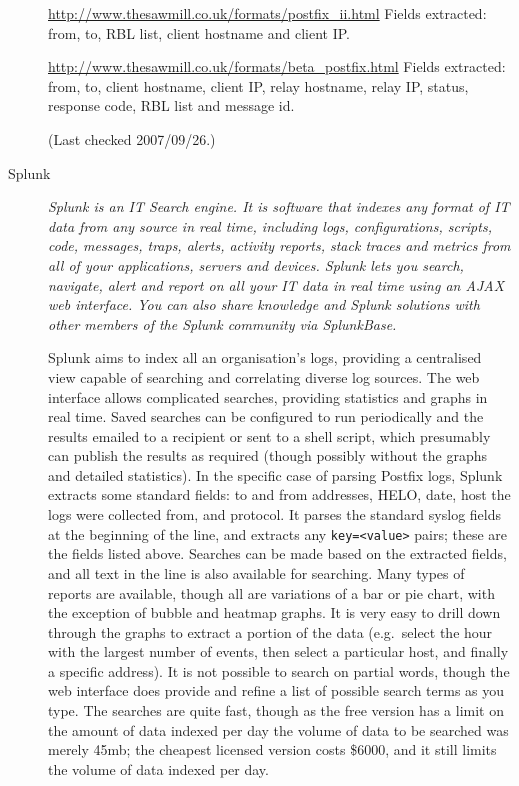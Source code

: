 \documentclass[a4paper,12pt,draft]{article}
\begin{document}
\begin{description}
        \url{http://www.thesawmill.co.uk/formats/postfix_ii.html} \newline
        Fields extracted: from, to, RBL list, client hostname and client
        IP\@.

        \url{http://www.thesawmill.co.uk/formats/beta_postfix.html}
        \newline
        Fields extracted: from, to, client hostname, client IP, relay
        hostname, relay IP, status, response code, RBL list and message id.

        (Last checked 2007/09/26.)

    \item [Splunk] \textit{Splunk is an IT Search engine. It is software
        that indexes any format of IT data from any source in real time,
        including logs, configurations, scripts, code, messages, traps,
        alerts, activity reports, stack traces and metrics from all of your
        applications, servers and devices. Splunk lets you search,
        navigate, alert and report on all your IT data in real time using
        an AJAX web interface. You can also share knowledge and Splunk
        solutions with other members of the Splunk community via
        SplunkBase.\/}

        Splunk aims to index all an organisation's logs, providing a
        centralised view capable of searching and correlating diverse log
        sources.  The web interface allows complicated searches, providing
        statistics and graphs in real time.  Saved searches can be
        configured to run periodically and the results emailed to a
        recipient or sent to a shell script, which presumably can publish
        the results as required (though possibly without the graphs and
        detailed statistics).  In the specific case of parsing Postfix
        logs, Splunk extracts some standard fields: to and from addresses,
        HELO, date, host the logs were collected from, and protocol.  It
        parses the standard syslog fields at the beginning of the line, and
        extracts any \texttt{key=<value>} pairs; these are the fields
        listed above.  Searches can be made based on the extracted fields,
        and all text in the line is also available for searching.  Many
        types of reports are available, though all are variations of a bar
        or pie chart, with the exception of bubble and heatmap graphs.  It
        is very easy to drill down through the graphs to extract a portion
        of the data (e.g.\ select the hour with the largest number of
        events, then select a particular host, and finally a specific
        address).  It is not possible to search on partial words, though
        the web interface does provide and refine a list of possible search
        terms as you type.  The searches are quite fast, though as the free
        version has a limit on the amount of data indexed per day the
        volume of data to be searched was merely 45mb; the cheapest
        licensed version costs \$6000, and it still limits the volume of
        data indexed per day.


\end{description}
\end{document}
